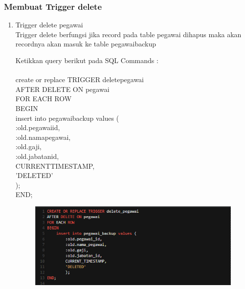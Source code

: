 \documentclass[12pt, times new roman, a4paper]{report}
\begin{document}
\subsubsection{Membuat Trigger delete}
\begin{enumerate}
\item Trigger delete pegawai\\
Trigger delete berfungsi jika record pada table pegawai dihapus maka akan recordnya akan masuk ke table pegawai\textunderscore backup\\
\par Ketikkan query berikut pada SQL Commands :\\
\\
create or replace TRIGGER delete\textunderscore pegawai\\
AFTER DELETE ON pegawai\\
FOR EACH ROW\\
BEGIN\\
    insert into pegawai\textunderscore backup values (\\
        :old.pegawai\textunderscore id,\\
        :old.nama\textunderscore pegawai,\\
        :old.gaji,\\
        :old.jabatan\textunderscore id,\\
        CURRENT\textunderscore TIMESTAMP,\\
        'DELETED'\\
        );\\
END;
\begin{figure}[h]
	\centering
		\includegraphics[scale=0.7]{gambar/14}
\end{figure}


\end{enumerate}
\end{document}

